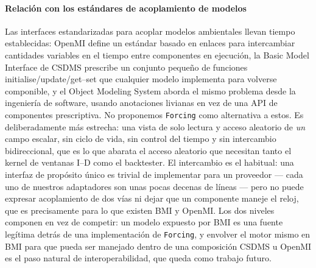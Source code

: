 \documentclass[authoryear,preprint,review,12pt]{elsarticle}
\begin{document}
\paragraph{Relación con los estándares de acoplamiento de modelos}
Las interfaces estandarizadas para acoplar modelos ambientales llevan tiempo
establecidas: OpenMI \citep{gregersen2007} define un estándar basado en enlaces
para intercambiar cantidades variables en el tiempo entre componentes en
ejecución, la Basic Model Interface de CSDMS \citep{peckham2013,hutton2020}
prescribe un conjunto pequeño de funciones initialise/update/get--set que
cualquier modelo implementa para volverse componible, y el Object Modeling System
\citep{david2013} aborda el mismo problema desde la ingeniería de software, usando
anotaciones livianas en vez de una API de componentes prescriptiva. No proponemos
\texttt{Forcing} como alternativa a estos. Es deliberadamente más estrecha: una
vista de solo lectura y acceso aleatorio de \emph{un} campo escalar, sin ciclo de
vida, sin control del tiempo y sin intercambio bidireccional, que es lo que abarata
el acceso aleatorio que necesitan tanto el kernel de ventanas I--D como el
backtester. El intercambio es el habitual: una interfaz de propósito único es
trivial de implementar para un proveedor --- cada uno de nuestros adaptadores
son unas pocas decenas de líneas --- pero no puede expresar acoplamiento de dos
vías ni dejar que un componente maneje el reloj, que es precisamente para lo que
existen BMI y OpenMI. Los dos niveles componen en vez de competir: un modelo
expuesto por BMI es una fuente legítima detrás de una implementación de
\texttt{Forcing}, y envolver el motor mismo en BMI para que pueda ser manejado
dentro de una composición CSDMS u OpenMI es el paso natural de interoperabilidad,
que queda como trabajo futuro.
\end{document}
